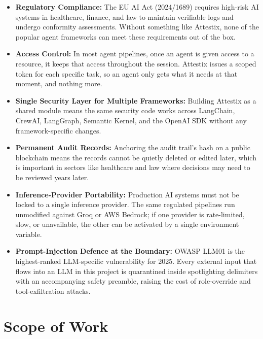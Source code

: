 \begin{itemize}

\item \textbf{Regulatory Compliance:} The EU AI Act (2024/1689) requires high-risk AI systems in healthcare, finance, and law to maintain verifiable logs and undergo conformity assessments. Without something like Attestix, none of the popular agent frameworks can meet these requirements out of the box.

\item \textbf{Access Control:} In most agent pipelines, once an agent is given access to a resource, it keeps that access throughout the session. Attestix issues a scoped token for each specific task, so an agent only gets what it needs at that moment, and nothing more.

\item \textbf{Single Security Layer for Multiple Frameworks:} Building Attestix as a shared module means the same security code works across LangChain, CrewAI, LangGraph, Semantic Kernel, and the OpenAI SDK without any framework-specific changes.

\item \textbf{Permanent Audit Records:} Anchoring the audit trail's hash on a public blockchain means the records cannot be quietly deleted or edited later, which is important in sectors like healthcare and law where decisions may need to be reviewed years later.

\item \textbf{Inference-Provider Portability:} Production AI systems must not be locked to a single inference provider. The same regulated pipelines run unmodified against Groq or AWS Bedrock; if one provider is rate-limited, slow, or unavailable, the other can be activated by a single environment variable.

\item \textbf{Prompt-Injection Defence at the Boundary:} OWASP LLM01 is the highest-ranked LLM-specific vulnerability for 2025. Every external input that flows into an LLM in this project is quarantined inside spotlighting delimiters with an accompanying safety preamble, raising the cost of role-override and tool-exfiltration attacks.

\end{itemize}

\section{Scope of Work}

